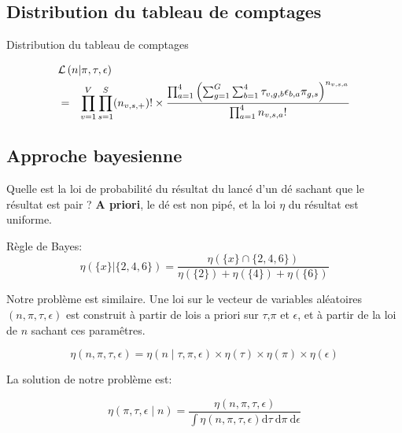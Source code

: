 \documentclass{beamer}
\newcommand{\fr}[1]{#1}
\newcommand{\en}[1]{}
\begin{document}
\subsection{\fr{Distribution du tableau de comptages}\en{Distribution of the counts}}
\begin{frame}{\fr{Distribution du tableau de comptages}\en{Distribution of the counts}}
    
\begin{eqnarray*}\lefteqn{\mathcal{L}\left(n | \pi, \tau,\epsilon \right)}\nonumber\\& =& \prod_{v=1}^{V} \prod_{s = 1}^{S} (n_{v,s,+})!\times\frac{\prod_{a = 1}^{4} \left( \sum_{g = 1}^{G}\sum_{b=1}^{4} \tau_{v,g,b}\epsilon_{b,a} \pi_{g,s}  \right)^{n_{v,s,a}}}{\prod_{a = 1}^{4}n_{v,s,a}!}\end{eqnarray*}
\end{frame}

\subsection{\fr{Approche bayesienne}}
\begin{frame}{\en{Approche bayesienne}}
\fr{Quelle est la loi de probabilité du résultat du lancé d'un dé sachant que le résultat est pair ?
{\bf A priori}, le dé est non pipé, et la loi $\eta$ du résultat est uniforme.
}

\end{frame}
\begin{frame}{\en{Approche bayesienne (2)}}
\fr{Règle de Bayes:}
$$\eta(\{x\}|\{2,4,6\})=\frac{\eta(\{x\}\cap\{2,4,6\})}{\eta(\{2\})+\eta(\{4\})+\eta(\{6\})}$$
\end{frame}
\begin{frame}{}
\fr{Notre problème est similaire. Une loi sur le vecteur de variables aléatoires }$(n,\pi,\tau,\epsilon)$
\fr{est construit à partir de lois a priori sur }$\tau$,$\pi$ \fr{et}\en{and} $\epsilon$, \fr{et à partir de la loi de $n$ sachant ces paramêtres.}

$$\eta(n,\pi,\tau,\epsilon)=  \eta(n\mid \tau,\pi,\epsilon)\times\eta(\tau)\times\eta(\pi)\times\eta(\epsilon)$$

La solution de notre problème est:

$$\eta(\pi,\tau,\epsilon\mid n)=\frac{\eta(n,\pi,\tau,\epsilon)}{\int \eta(n,\pi,\tau,\epsilon) \mathrm{d}\tau~\mathrm{d}\pi~\mathrm{d}\epsilon}$$


\end{frame}
\end{document}

